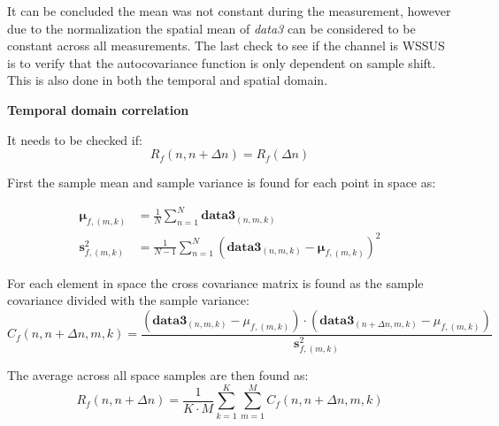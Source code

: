 It can be concluded the mean was not constant during the measurement, however due to the normalization the spatial mean of \textit{data3} can be considered to be constant across all measurements. The last check to see if the channel is \gls{WSSUS} is to verify that the autocovariance function is only dependent on sample shift. This is also done in both the temporal and spatial domain.

\newpage
\textbf{Temporal domain correlation}

It needs to be checked if:
\begin{equation}\label{eq:autocovariance_check}
R_f(n,n+\Delta n) = R_f(\Delta n) 
\end{equation}
\begin{where}
\end{where}

First the sample mean and sample variance is found for each point in space as:

\begin{align}
\mathbf{\mu}_{f,(m,k)} &= \frac{1}{N}\sum_{n = 1}^{N} \textbf{data3}_{(n,m,k)} \\
\textbf{s}_{f,(m,k)}^2 &= \frac{1}{N-1}\sum_{n = 1}^{N} \left( \textbf{data3}_{(n,m,k)} - \mathbf{\mu}_{f,(m,k)} \right)^2 
\end{align}
\begin{where}
\end{where}

For each element in space the cross covariance matrix is found as the sample covariance divided with the sample variance:
\begin{equation}
C_f(n,n+\Delta n,m,k) = \frac{\left(\textbf{data3}_{(n,m,k)}-\mu_{f,(m,k)}\right)\cdot \left(\textbf{data3}_{(n+\Delta n,m,k)}-\mu_{f,(m,k)}\right)}{\textbf{s}_{f,(m,k)}^2}
\end{equation}
\begin{where}
\end{where}

The average across all space samples are then found as:
\begin{equation}
R_f(n,n+\Delta n) = \frac{1}{K\cdot M}\sum_{k = 1}^{K}\sum_{m = 1}^{M} C_f(n,n+\Delta n,m,k)
\end{equation}



